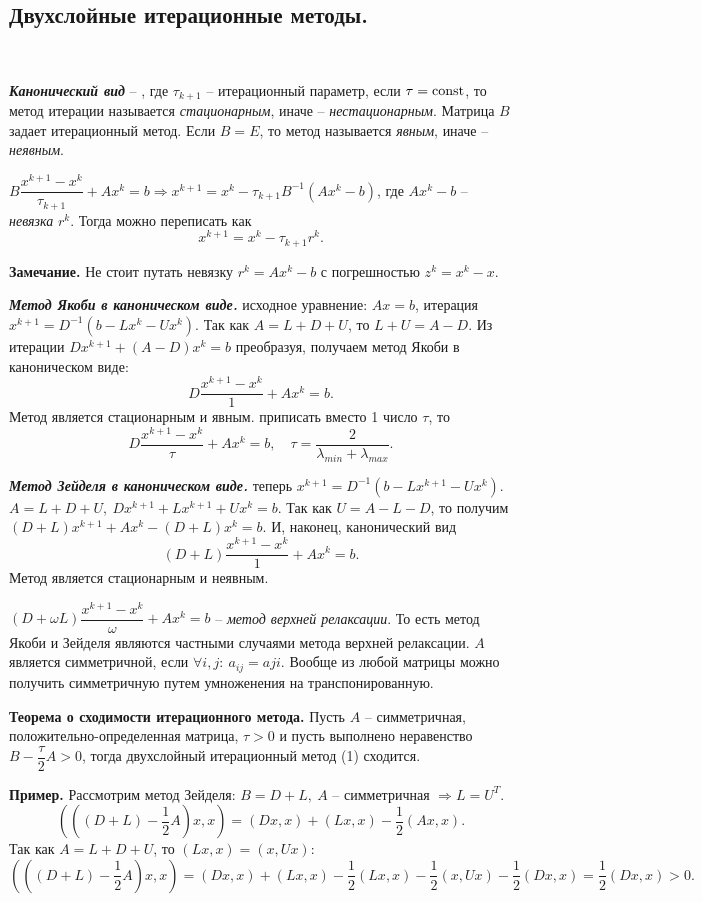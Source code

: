 \documentclass[9pt]{article}
\begin{document}
\subsection{Двухслойные итерационные методы.}

\ 
\par\textbf{\textit{Канонический вид}} -- , где \(\tau_{k+1}\) -- итерационный параметр, если \(\tau=\operatorname{const}\), то метод итерации называется \textit{стационарным}, иначе -- \textit{нестационарным}. Матрица \(B\) задает итерационный метод. Если \(B=E\), то метод называется \textit{явным}, иначе -- \textit{неявным}.
\par\(B\dfrac{x^{k+1}-x^k}{\tau_{k+1}}+Ax^k=b\Rightarrow x^{k+1}=x^k-\tau_{k+1}B^{-1}(Ax^k-b)\), где \(Ax^k-b\) -- \textit{невязка} \(r^k\). Тогда можно переписать как
\[x^{k+1}=x^k-\tau_{k+1}r^k.\]
\par\textbf{Замечание.} Не стоит путать невязку \(r^k=Ax^k-b\) с погрешностью \(z^k=x^k-x\).
\par\textit{\textbf{Метод Якоби в каноническом виде.}}
 исходное уравнение: \(Ax=b\), итерация \(x^{k+1}=D^{-1}(b-Lx^k-Ux^k)\). Так как \(A=L+D+U\), то \(L+U=A-D\). Из итерации \(Dx^{k+1}+(A-D)x^k=b\) преобразуя, получаем метод Якоби в каноническом виде:
\[D\dfrac{x^{k+1}-x^k}{1}+Ax^k=b.\]
Метод является стационарным и явным.
 приписать вместо 1 число \(\tau\), то
\begin{equation}
    D\dfrac{x^{k+1}-x^k}{\tau}+Ax^k=b,\quad \tau=\dfrac{2}{\lambda_{min}+\lambda_{max}}.
\end{equation}
\par\textbf{\textit{Метод Зейделя в каноническом виде.}}
 теперь \(x^{k+1}=D^{-1}(b-Lx^{k+1}-Ux^k)\). \(A=L+D+U,\ Dx^{k+1}+Lx^{k+1}+Ux^k=b\). Так как \(U=A-L-D\), то получим \((D+L)x^{k+1}+Ax^k-(D+L)x^k=b\). И, наконец, канонический вид
\[(D+L)\dfrac{x^{k+1}-x^k}{1}+Ax^k=b.\]
Метод является стационарным и неявным.
\par\((D+\omega L)\dfrac{x^{k+1}-x^k}{\omega}+Ax^k=b\) -- \textit{метод верхней релаксации}. То есть метод Якоби и Зейделя являются частными случаями метода верхней релаксации.
\parМатрица \(A\) является симметричной, если \(\forall i,j:\ a_{ij}=a{ji}\). Вообще из любой матрицы можно получить симметричную путем умноженения на транспонированную.
\par\textbf{Теорема о сходимости итерационного метода.} Пусть \(A\) -- симметричная, положительно-определенная матрица, \(\tau>0\) и пусть выполнено неравенство \(B-\dfrac{\tau}{2}A>0\), тогда двухслойный итерационный метод (1) сходится.
\par\textbf{Пример.} Рассмотрим метод Зейделя: \(B=D+L,\ A\) -- симметричная \(\Rightarrow L=U^T\).
\[(((D+L)-\dfrac{1}{2}A)x,x)=(Dx,x)+(Lx,x)-\dfrac{1}{2}(Ax,x).\]
Так как \(A=L+D+U\), то \((Lx,x)=(x,Ux)\):
\[(((D+L)-\dfrac{1}{2}A)x,x)=(Dx,x)+(Lx,x)-\dfrac{1}{2}(Lx,x)-\dfrac{1}{2}(x,Ux)-\dfrac{1}{2}(Dx,x)=\dfrac{1}{2}(Dx,x)>0.\]
\end{document}
